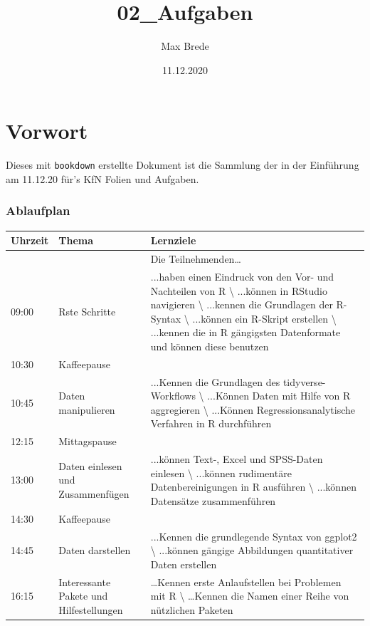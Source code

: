 \documentclass[
]{book}
\title{02\_Aufgaben}
\author{Max Brede}
\date{11.12.2020}
\begin{document}
\maketitle

{
\setcounter{tocdepth}{1}
\tableofcontents
}
\hypertarget{vorwort}{%
\chapter{Vorwort}\label{vorwort}}

Dieses mit \texttt{bookdown} erstellte Dokument ist die Sammlung der in der Einführung am 11.12.20 für's KfN Folien und Aufgaben.

\hypertarget{ablaufplan}{%
\subsection{Ablaufplan}\label{ablaufplan}}

\begin{tabular}{l|l|l}
\hline
Uhrzeit & Thema & Lernziele\\
\hline
 &  & Die Teilnehmenden…\\
\hline
09:00 & Rste Schritte & ...haben einen Eindruck von den Vor- und Nachteilen von R \textbackslash{}
 ...können in RStudio navigieren \textbackslash{}
 ...kennen die Grundlagen der R-Syntax \textbackslash{}
 ...können ein R-Skript erstellen \textbackslash{}
 ...kennen die in R gängigsten Datenformate und können diese benutzen\\
\hline
10:30 & Kaffeepause & \\
\hline
10:45 & Daten manipulieren & ...Kennen die Grundlagen des tidyverse-Workflows \textbackslash{}
 ...Können Daten mit Hilfe von R aggregieren \textbackslash{}
 ...Können Regressionsanalytische Verfahren in R durchführen\\
\hline
12:15 & Mittagspause & \\
\hline
13:00 & Daten einlesen und Zusammenfügen & ...können Text-, Excel und SPSS-Daten einlesen \textbackslash{}
 ...können rudimentäre Datenbereinigungen in R ausführen \textbackslash{}
 ...können Datensätze zusammenführen\\
\hline
14:30 & Kaffeepause & \\
\hline
14:45 & Daten darstellen & ...Kennen die grundlegende Syntax von ggplot2 \textbackslash{}
 ...können gängige Abbildungen quantitativer Daten erstellen\\
\hline
16:15 & Interessante Pakete und Hilfestellungen & …Kennen erste Anlaufstellen bei Problemen mit R \textbackslash{}
 …Kennen die Namen einer Reihe von nützlichen Paketen\\
\hline
\end{tabular}
\end{document}
